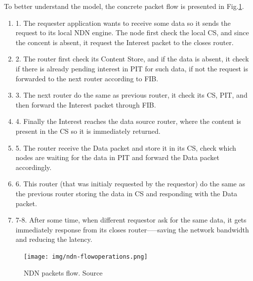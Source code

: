 To better understand the model, the concrete packet flow is presented in Fig.\ref{fig:ndn-flow}. 
\begin{enumerate}
    \item 1. The requester application wants to receive some data so it sends the request to its local NDN engine. The node first check the local CS, and since the concent is absent, it request the Interest packet to the closes router.
    \item 2. The router first check its Content Store, and if the data is absent, it check if there is already pending interest in PIT for such data, if not the request is forwarded to the next router according to FIB.  
    \item 3. The next router do the same as previous router, it check its CS, PIT, and then forward the Interest packet through FIB.
    \item 4. Finally the Interest reaches the data source router, where the content is present in the CS so it is immediately returned.
    \item 5. The router receive the Data packet and store it in its CS, check which nodes are waiting for the data in PIT and forward the Data packet accordingly.
    \item 6. This router (that was initialy requested by the requestor) do the same as the previous router storing the data in CS and responding with the Data packet.
    \item 7-8. After some time, when different requestor ask for the same data, it gets immediately response from its closes router–––saving the network bandwidth and reducing the latency.
\end{enumerate}

\begin{figure}[h]
    \centering
    \texttt{[image: img/ndn-flowoperations.png]}
    \caption{NDN packets flow. Source \cite{ahlgren2012survey}}
    \label{fig:ndn-flow}
\end{figure}

